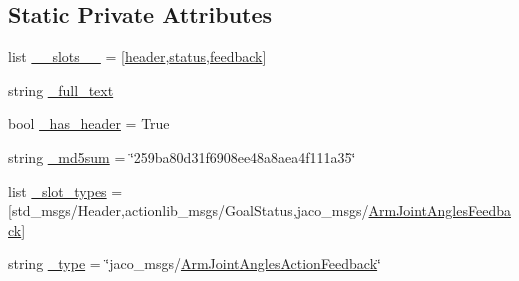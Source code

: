 \subsection*{Static Private Attributes}
\begin{DoxyCompactItemize}
\item 
list \hyperlink{classjaco__msgs_1_1msg_1_1__ArmJointAnglesActionFeedback_1_1ArmJointAnglesActionFeedback_a35aaeb47e70e4f31d69028e47127db45}{\+\_\+\+\_\+slots\+\_\+\+\_\+} = \mbox{[}\textquotesingle{}\hyperlink{classjaco__msgs_1_1msg_1_1__ArmJointAnglesActionFeedback_1_1ArmJointAnglesActionFeedback_a7b1ea60184ef4d13c068de04538e8b50}{header}\textquotesingle{},\textquotesingle{}\hyperlink{classjaco__msgs_1_1msg_1_1__ArmJointAnglesActionFeedback_1_1ArmJointAnglesActionFeedback_a8f64e8403349abcd0a905118e41ba76d}{status}\textquotesingle{},\textquotesingle{}\hyperlink{classjaco__msgs_1_1msg_1_1__ArmJointAnglesActionFeedback_1_1ArmJointAnglesActionFeedback_ab40b90e61418b57e980514d739c2e72f}{feedback}\textquotesingle{}\mbox{]}
\item 
string \hyperlink{classjaco__msgs_1_1msg_1_1__ArmJointAnglesActionFeedback_1_1ArmJointAnglesActionFeedback_a29733a793f755bdd08b6da87ccd33095}{\+\_\+full\+\_\+text}
\item 
bool \hyperlink{classjaco__msgs_1_1msg_1_1__ArmJointAnglesActionFeedback_1_1ArmJointAnglesActionFeedback_a139ab527728e5b4ff0e85b15837cacbf}{\+\_\+has\+\_\+header} = True
\item 
string \hyperlink{classjaco__msgs_1_1msg_1_1__ArmJointAnglesActionFeedback_1_1ArmJointAnglesActionFeedback_a2f18ed0aace98c405e7440a97c2e5f06}{\+\_\+md5sum} = \char`\"{}259ba80d31f6908ee48a8aea4f111a35\char`\"{}
\item 
list \hyperlink{classjaco__msgs_1_1msg_1_1__ArmJointAnglesActionFeedback_1_1ArmJointAnglesActionFeedback_a4569dd7969b84b8413fa6936b97ba109}{\+\_\+slot\+\_\+types} = \mbox{[}\textquotesingle{}std\+\_\+msgs/Header\textquotesingle{},\textquotesingle{}actionlib\+\_\+msgs/Goal\+Status\textquotesingle{},\textquotesingle{}jaco\+\_\+msgs/\hyperlink{classjaco__msgs_1_1msg_1_1__ArmJointAnglesFeedback_1_1ArmJointAnglesFeedback}{Arm\+Joint\+Angles\+Feedback}\textquotesingle{}\mbox{]}
\item 
string \hyperlink{classjaco__msgs_1_1msg_1_1__ArmJointAnglesActionFeedback_1_1ArmJointAnglesActionFeedback_a025c092a0be0863500b5b18bfdc7935b}{\+\_\+type} = \char`\"{}jaco\+\_\+msgs/\hyperlink{classjaco__msgs_1_1msg_1_1__ArmJointAnglesActionFeedback_1_1ArmJointAnglesActionFeedback}{Arm\+Joint\+Angles\+Action\+Feedback}\char`\"{}
\end{DoxyCompactItemize}


